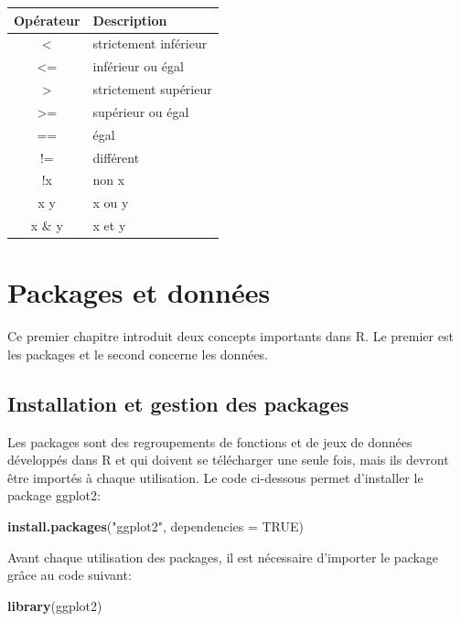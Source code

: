 \documentclass[
]{book}
\newenvironment{Shaded}{\begin{snugshade}}{\end{snugshade}}
\newcommand{\AttributeTok}[1]{\textcolor[rgb]{0.13,0.29,0.53}{#1}}
\newcommand{\ConstantTok}[1]{\textcolor[rgb]{0.56,0.35,0.01}{#1}}
\newcommand{\FunctionTok}[1]{\textcolor[rgb]{0.13,0.29,0.53}{\textbf{#1}}}
\newcommand{\NormalTok}[1]{#1}
\newcommand{\StringTok}[1]{\textcolor[rgb]{0.31,0.60,0.02}{#1}}
\begin{document}
\begin{longtable}[]{@{}cl@{}}
\toprule\noalign{}
Opérateur & Description \\
\midrule\noalign{}
\endhead
\bottomrule\noalign{}
\endlastfoot
\textless{} & strictement inférieur \\
\textless= & inférieur ou égal \\
\textgreater{} & strictement supérieur \\
\textgreater= & supérieur ou égal \\
== & égal \\
!= & différent \\
!x & non x \\
x \textbar{} y & x ou y \\
x \& y & x et y \\
\end{longtable}

\chapter{Packages et données}\label{packages-et-donnuxe9es}

Ce premier chapitre introduit deux concepts importants dans R. Le premier est les packages et le second concerne les données.

\section{Installation et gestion des packages}\label{installation-et-gestion-des-packages}

Les packages sont des regroupements de fonctions et de jeux de données développés dans R et qui doivent se télécharger une seule fois, mais ils devront être importés à chaque utilisation. Le code ci-dessous permet d'installer le package ggplot2:

\begin{Shaded}
\begin{Highlighting}[]
\FunctionTok{install.packages}\NormalTok{(}\StringTok{"ggplot2"}\NormalTok{, }\AttributeTok{dependencies =} \ConstantTok{TRUE}\NormalTok{)}
\end{Highlighting}
\end{Shaded}

Avant chaque utilisation des packages, il est nécessaire d'importer le package grâce au code suivant:

\begin{Shaded}
\begin{Highlighting}[]
\FunctionTok{library}\NormalTok{(ggplot2)}
\end{Highlighting}
\end{Shaded}
\end{document}
